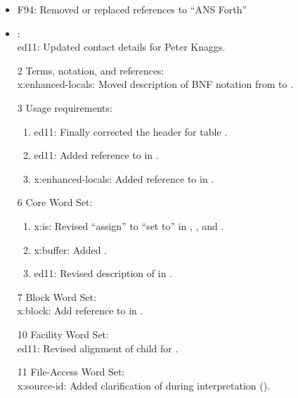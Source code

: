 	\begin{itemize}
	\item \textsf{F94}: Removed or replaced references to ``ANS Forth''

	\item {}: \\						%
		\textsf{ed11}: Updated contact details for Peter Knaggs.

	\item[2] Terms, notation, and references: \\	%
		\textsf{x:enhanced-locals}: Moved description of BNF notation from
			 to .

	\item[3] Usage requirements:					%
		\begin{enumerate}
		\item \textsf{ed11}: Finally corrected the header for table .
		\item \textsf{ed11}: Added reference to  in .
		\item \textsf{x:enhanced-locals}: Added reference to  in .
		\end{enumerate}

	\item[6] Core Word Set:							%
		\begin{enumerate}
		\item \textsf{x:is}: Revised ``assign'' to ``set to'' in
			,
			,
			 and
			.
		\item \textsf{x:buffer}: Added .
		\item \textsf{ed11}: Revised description of \texttt{} in .
		\end{enumerate}

	\item[7] Block Word Set: \\					%
		\textsf{x:block}: Add reference to  in .

	\item[10] Facility Word Set: \\				%
		\textsf{ed11}: Revised alignment of child for .

	\item[11] File-Access Word Set: \\			%
		\textsf{x:source-id}: Added clarification of  during interpretation ().


\end{itemize}
